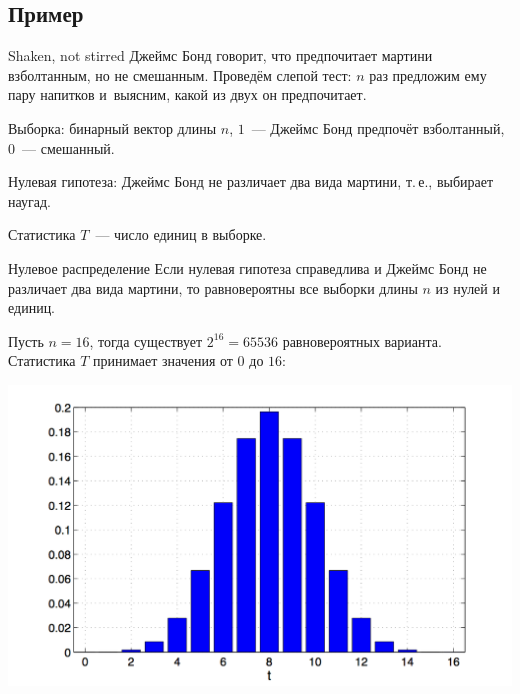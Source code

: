 \documentclass[9pt,pdf,utf8,hyperref={unicode},aspectratio=169]{beamer}
\begin{document}
\subsection{Пример}
\begin{frame}{Shaken, not stirred}
% 
	Джеймс Бонд говорит, что предпочитает мартини взболтанным, но не смешанным. Проведём слепой тест: $n$ раз предложим ему пару напитков и~выясним, какой из двух он предпочитает.
	
	\bigskip
	
	Выборка: бинарный вектор длины $n$, $1$~--- Джеймс Бонд предпочёт взболтанный, $0$~--- смешанный.
	
	\bigskip
	
	Нулевая гипотеза: Джеймс Бонд не различает два вида мартини, т.\,е., выбирает наугад.
	
	\bigskip
	
	Статистика $T$~--- число единиц в выборке.
\end{frame}

\begin{frame}{Нулевое распределение}
% 
	Если нулевая гипотеза справедлива и Джеймс Бонд не различает два вида мартини, то равновероятны все выборки длины $n$ из нулей и единиц.
	
	\bigskip
	
	Пусть $n=16$, тогда существует $2^{16} = 65536$ равновероятных варианта. Статистика $T$ принимает значения от $0$ до $16$:
	
	\begin{center}
		\includegraphics[height=0.6\textheight]{bond1.png}
	\end{center}
	
\end{frame}
\end{document}
